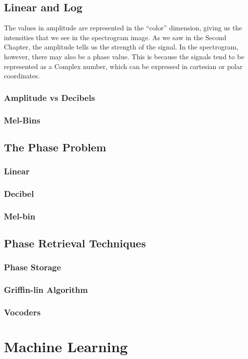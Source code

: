 \documentclass{book}
\begin{document}
  \section{Linear and Log}
\qquad The values in amplitude are represented in the “color” dimension, giving us the intensities that we see in the spectrogram image. As we saw in the Second Chapter, the amplitude tells us the strength of the signal. In the spectrogram, however, there may also be a phase value. This is because the signals tend to be represented as a Complex number, which can be expressed in cartesian or polar coordinates.
\par
    \subsection{Amplitude vs Decibels}
    \subsection{Mel-Bins}
  \section{The Phase Problem}
    \subsection{Linear}
    \subsection{Decibel}
    \subsection{Mel-bin}
  \section{Phase Retrieval Techniques}
    \subsection{Phase Storage}
    \subsection{Griffin-lin Algorithm}
    \subsection{Vocoders}

\chapter{Machine Learning}
\end{document}
